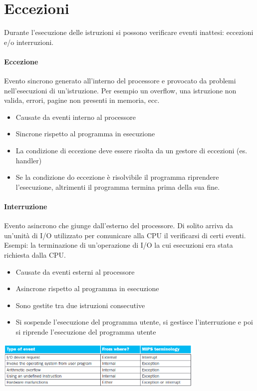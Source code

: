 \documentclass[12pt, a4paper, openany]{book}
\begin{document}

\section{Eccezioni}
Durante l'esecuzione delle istruzioni si possono verificare eventi inattesi: eccezioni
e/o interruzioni.
\paragraph*{Eccezione} Evento sincrono generato all'interno del processore e provocato
da problemi nell'esecuzioni di un'istruzione. Per esempio un overflow, una istruzione
non valida, errori, pagine non presenti in memoria, ecc.
\begin{itemize}
    \item Causate da eventi interno al processore
    \item Sincrone rispetto al programma in esecuzione
    \item La condizione di eccezione deve essere risolta da un gestore di eccezioni (es. handler)
    \item Se la condizione do eccezione è risolvibile il programma riprendere l'esecuzione, altrimenti
    il programma termina prima della sua fine.
\end{itemize}

\paragraph*{Interruzione} Evento asincrono che giunge dall'esterno del processore.
Di solito arriva da un'unità di I/O utilizzato per comunicare alla CPU il verificarsi
di certi eventi.
Esempi: la terminazione di un'operazione di I/O la cui esecuzioni era stata richiesta dalla
CPU.
\begin{itemize}
    \item Causate da eventi esterni al processore
    \item Asincrone rispetto al programma in esecuzione
    \item Sono gestite tra due istruzioni consecutive
    \item Si sospende l'esecuzione del programma utente, si gestisce l'interruzione e poi
    si riprende l'esecuzione del programma utente
\end{itemize}

\begin{center}
    \includegraphics[width=100mm, scale=0.5]{Exception and interrupt.png}
\end{center}
\end{document}
